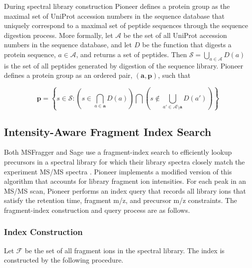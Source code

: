 \documentclass[pdflatex,sn-nature]{sn-jnl}
\begin{document}
During spectral library construction Pioneer defines a protein group as the maximal set of UniProt accession numbers in the sequence database that uniquely correspond to a maximal set of peptide sequences through the sequence digestion process. More formally, let $\mathcal{A}$ be the set of all UniProt accession numbers in the sequence database, and let $D$ be the function that digests a protein sequence, $a \in \mathcal{A}$, and returns a set of peptides. Then $\mathcal{S} = {\bigcup_{a \in \mathcal{A}} D(a)}$ is the set of all peptides generated by digestion of the sequence library. Pioneer defines a protein group as an ordered pair, $(\mathbf{a}, \mathbf{p})$, such that

\begin{equation}
\mathbf{p} = \left\{s 
\in \mathcal{S} : \left( s \in \bigcap_{a \in \mathbf{a}} D(a)\right) \bigcap \left(s \notin \bigcup_{a' \in \mathcal{A}\setminus\mathbf{a}} D(a') \right)\right\}
\end{equation}

\subsection{Intensity-Aware Fragment Index Search}\label{subsec3}

Both MSFragger and Sage use a fragment-index search to efficiently lookup precursors in a spectral library for which their library spectra closely match the experiment MS/MS spectra \cite{Kong2017-gg,Lazear2023-ci}. Pioneer implements a modified version of this algorithm that accounts for library fragment ion intensities. For each peak in an MS/MS scan, Pioneer performs an index query that records all library ions that satisfy the retention time, fragment m/z, and precursor m/z constraints. The fragment-index construction and query process are as follows.

\subsubsection{Index Construction}
Let $\mathcal{F}$ be the set of all fragment ions in the spectral library. The index is constructed by the following procedure.
\end{document}
